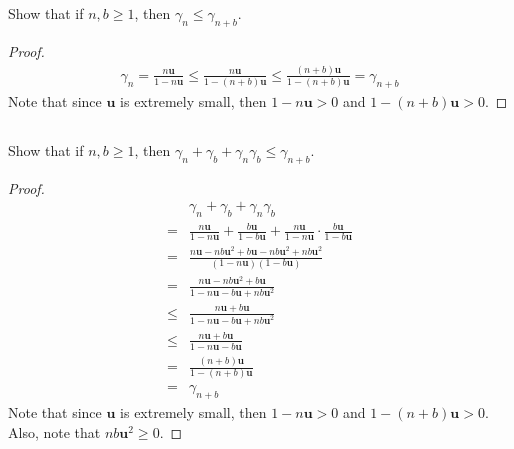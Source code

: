 \documentclass[11pt,a4paper]{article}
\newcommand{\bu}{\mathbf{u}}
\begin{document}
\newpage
\setcounter{section}{17}
\section{}
\subsection{}
Show that if $n, b \geq 1$, then $\gamma_n \leq \gamma_{n+b}$. 
\begin{proof}
    \begin{align}
        \gamma_n = \frac{n\bu}{1-n\bu} 
        \leq \frac{n\bu}{1-(n+b)\bu} 
        \leq \frac{(n+b)\bu}{1-(n+b)\bu} 
        = \gamma_{n+b}
    \end{align}
    Note that since $\bu$ is extremely small, 
    then $1-n\bu > 0$ and $1-(n+b)\bu > 0$.
\end{proof}

\subsection{}
Show that if $n, b \geq 1$, then $\gamma_n + \gamma_b+\gamma_n\gamma_b \leq \gamma_{n+b}$. 
\begin{proof}
    \begin{align}
        & \gamma_n + \gamma_b + \gamma_n \gamma_b  \\
     = & \frac{n\bu}{1-n\bu} + \frac{b\bu}{1-b\bu} + \frac{n\bu}{1-n\bu}\cdot \frac{b\bu}{1-b\bu} \\
     = & \frac{n\bu - nb\bu^2 + b\bu - nb\bu^2 + nb\bu^2}{(1-n\bu)(1-b\bu)} \\
     = & \frac{n\bu - nb\bu^2 + b\bu}{1-n\bu-b\bu+nb\bu^2} \\
     \leq & \frac{n\bu + b\bu}{1-n\bu-b\bu+nb\bu^2} \\
     \leq & \frac{n\bu + b\bu}{1-n\bu-b\bu} \\
     = & \frac{(n+b)\bu}{1-(n+b)\bu} \\
     = & \gamma_{n+b}
    \end{align}
    Note that since $\bu$ is extremely small, 
    then $1-n\bu > 0$ and $1-(n+b)\bu > 0$.
    Also, note that $nb\bu^2 \geq 0$.
\end{proof}




\newpage
\setcounter{section}{18}
\section{}
\end{document}
